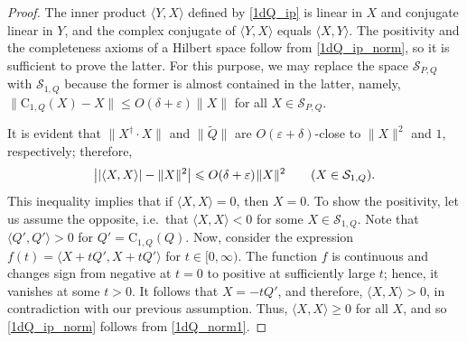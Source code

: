 \documentclass[12pt]{article}
\newcommand{\calS}{\mathcal{S}}
\newcommand{\ts}{\mkern1mu}
\newcommand{\Co}{\mathrm{C}}
\newcommand{\wt}{\widetilde}
\newcommand*{\braket}[2]{\langle{#1},{#2}\rangle}
\newcommand{\eps}{\varepsilon}
\renewcommand{\le}{\leqslant}
\renewcommand{\ge}{\geqslant}
\newtheorem[definition]{Definition}[Theorem]{Definition}
\newtheorem[remark]{Example}[Theorem]{Example}
\newtheorem[remark]{Remark}[Theorem]{Remark}
\newtheorem[remark]{Question}[Theorem]{Open question}
\newtheorem*[definition]{definition}{Definition}
\newtheorem*[remark]{example}{Example}
\newtheorem*[remark]{remark}{Remark}
\newtheorem*[remark]{question}{Open question}
\numberwithin{equation}{section}
\begin{document}
\begin{proof}
The inner product $\braket{Y}{X}$ defined by \eqref{1dQ_ip} is linear in $X$ and conjugate linear in $Y$, and the complex conjugate of $\braket{Y}{X}$ equals $\braket{X}{Y}$. The positivity and the completeness axioms of a Hilbert space follow from \eqref{1dQ_ip_norm}, so it is sufficient to prove the latter. For this purpose, we may replace the space $\calS_{P,Q}$ with $\calS_{1,Q}$ because the former is almost contained in the latter, namely, $\|\Co_{1,Q}(X)-X\|\le O(\delta+\eps)\|X\|$ for all $X\in\calS_{P,Q}$.

It is evident that $\|X^{\dag}\cdot X\|$ and $\|\wt{Q}\|$ are $O(\eps+\delta)$-close to $\|X\|^2$ and $1$, respectively; therefore,
\begin{equation}\label{1dQ_norm1}
\bigl||\braket{X}{X}|-\|X\|^2\bigr|\le O(\delta+\eps)\ts\|X\|^2\qquad
(X\in\calS_{1,Q}).
\end{equation}
This inequality implies that if $\braket{X}{X}=0$, then $X=0$. To show the positivity, let us assume the opposite, i.e.\ that $\braket{X}{X}<0$ for some $X\in\calS_{1,Q}$. Note that $\braket{Q'}{Q'}>0$ for $Q'=\Co_{1,Q}(Q)$. Now, consider the expression $f(t)=\braket{X+tQ'}{X+tQ'}$ for $t\in[0,\infty)$. The function $f$ is continuous and changes sign from negative at $t=0$ to positive at sufficiently large $t$; hence, it vanishes at some $t>0$. It follows that $X=-tQ'$, and therefore, $\braket{X}{X}>0$, in contradiction with our previous assumption. Thus, $\braket{X}{X}\ge 0$ for all $X$, and so \eqref{1dQ_ip_norm} follows from \eqref{1dQ_norm1}.
\end{proof}
\end{document}
